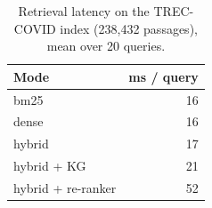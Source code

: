 \begin{table}[t]
\centering\small
\begin{tabular}{lr}
\toprule
Mode & ms / query \\
\midrule
bm25 & 16 \\
dense & 16 \\
hybrid & 17 \\
hybrid + KG & 21 \\
hybrid + re-ranker & 52 \\
\bottomrule
\end{tabular}
\caption{Retrieval latency on the TREC-COVID index (238,432 passages), mean over 20 queries.}
\label{tab:latency_retrieval}
\end{table}
